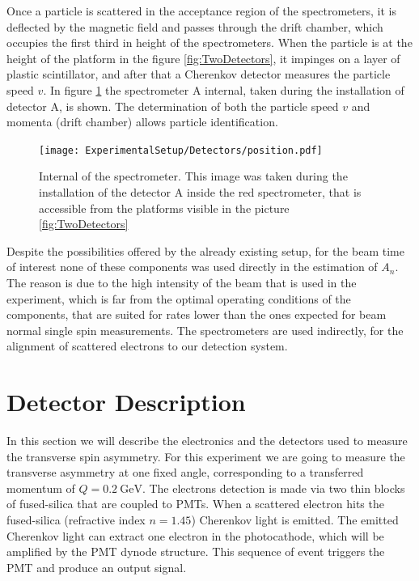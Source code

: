 Once a particle is scattered in the acceptance region of the spectrometers, it is deflected by the magnetic field and passes through the drift chamber, which occupies the first third in height of the spectrometers. 
When the particle is at the height of the platform in the figure \ref{fig:TwoDetectors}, it impinges on a layer of plastic scintillator, and after that a Cherenkov detector  measures the particle speed $v$. In figure \ref{fig:internal} the spectrometer A internal, taken during the installation of detector A, is shown. The determination of both the particle speed $v$ and momenta (drift chamber) allows particle identification.
\begin{figure}
\centering
\caption{Internal of the spectrometer. This image was taken during the installation of the detector A inside the red spectrometer, that is accessible from the platforms visible in the picture \ref{fig:TwoDetectors}}
\texttt{[image: ExperimentalSetup/Detectors/position.pdf]}
\label{fig:internal}
\end{figure} 

Despite the possibilities offered by the already existing setup, for the beam time of interest none of these components was used directly in the estimation of $A_{n}$. The reason is due to the high intensity of the beam that is used in the experiment, which is far from the optimal operating conditions of the components, that are suited for rates lower than the ones expected for beam normal single spin measurements. The spectrometers are used indirectly, for the alignment of scattered electrons to our detection system.


\section{Detector Description} \label{detectors}
In this section we will describe the electronics and the detectors used to measure the transverse spin asymmetry.
For this experiment we are going to measure the transverse asymmetry at one fixed angle, corresponding to a transferred momentum of $Q = \SI{0.2}{\giga \electronvolt}$. The electrons detection is 
made via two thin blocks of fused-silica that are coupled to PMTs. When a scattered electron hits the fused-silica (refractive index $n = 1.45$) Cherenkov light is emitted. The emitted Cherenkov light can extract one electron in the photocathode, which will be amplified by the PMT dynode structure. This sequence of event triggers the PMT and produce an output signal.

